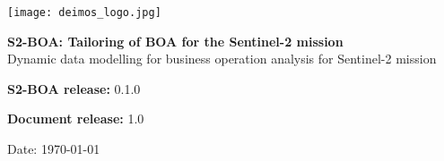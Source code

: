 %
%
%

\begin{titlepage}
	
    \texttt{[image: deimos\_logo.jpg]}
    
    \vspace{2.0cm}
    
    	\begin{center}
    
    \vspace{2cm}
    
    \LARGE{\textbf{S2-BOA: Tailoring of BOA for the Sentinel-2 mission}} \\    
    \LARGE{Dynamic data modelling for business operation analysis for Sentinel-2 mission}
    
    	\end{center}    
    
    \vspace{7.0cm}

    \vspace{0.5cm}

    \Large{\textbf{S2-BOA release:} 0.1.0}

    \Large{\textbf{Document release:} 1.0}

    \vspace{1cm}
    
    \large{Date: \today}
    
\end{titlepage}
